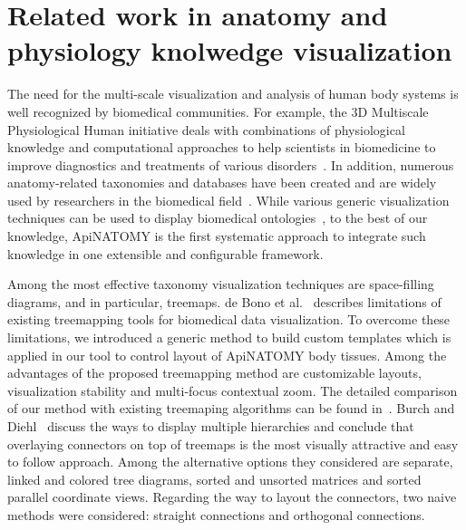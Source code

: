 \section{Related work in anatomy and physiology knolwedge visualization} \label{sect:relatedWork}                                          %

The need for the multi-scale visualization and analysis of human body systems is well recognized by biomedical communities. For example, the 3D Multiscale Physiological Human initiative deals with combinations of physiological knowledge and computational approaches to help scientists in biomedicine to improve diagnostics and treatments of various disorders~\cite{MRC09,Mag09}. In addition, numerous anatomy-related taxonomies and databases have been created and are widely used by researchers in the biomedical field~\cite{BDB08}. While various generic visualization techniques can be used to display biomedical ontologies~\cite{KHL+07}, to the best of our knowledge, ApiNATOMY is the first systematic approach to integrate such knowledge in one extensible and configurable framework.

Among the most effective taxonomy visualization techniques are space-filling diagrams, and in particular, treemaps.
de Bono et al.~\cite{BGS12} describes limitations of existing treemapping tools for biomedical data visualization. To overcome these limitations, we introduced a generic method to build custom templates which is applied in our tool to control layout of ApiNATOMY body tissues. Among the advantages of the proposed treemapping method are customizable layouts, visualization stability and multi-focus contextual zoom. The detailed comparison of our method with existing treemaping algorithms can be found in~\cite{KBK14}.
Burch and Diehl~\cite{BD06} discuss the ways to display multiple hierarchies and conclude that overlaying connectors on top of treemaps is the most visually attractive and easy to follow approach. Among the alternative options they considered are separate, linked and colored tree diagrams, sorted and unsorted matrices and sorted parallel coordinate views. Regarding the way to layout the connectors, two naive methods were considered: straight connections and orthogonal connections. %

